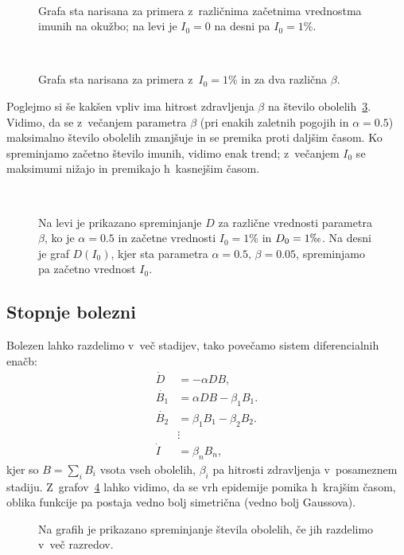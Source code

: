 \documentclass[a4paper,pdftex,10pt]{article}
\numberwithin{equation}{section} %
\numberwithin{figure}{section} %
\numberwithin{table}{section} %
\begin{document}
\begin{figure}    
    \resizebox{0.48\linewidth}{!}{}
    \resizebox{0.48\linewidth}{!}{}\\
    \caption{Grafa sta narisana za primera z~različnima začetnima vrednostma imunih na 
    okužbo; na levi je $I_0=0$ na desni pa $I_0=1\%$.}
    \label{slika15}
\end{figure}
\begin{figure}    
    \resizebox{0.48\linewidth}{!}{}
    \resizebox{0.48\linewidth}{!}{}\\
    \caption{Grafa sta narisana za primera z~$I_0=1\%$ in za dva različna $\beta$.}
    \label{slika16}
\end{figure}

Poglejmo si še kakšen vpliv ima hitrost zdravljenja $\beta$ na število 
obolelih~\ref{slika17}.  Vidimo, da se z~večanjem parametra $\beta$ (pri enakih zaletnih 
pogojih in $\alpha=0.5$) maksimalno število obolelih zmanjšuje in se premika proti daljšim
časom. 
Ko spreminjamo začetno število imunih, vidimo enak trend; z~večanjem $I_0$ se 
maksimumi nižajo in premikajo h~kasnejšim časom.
\begin{figure}    
    \resizebox{0.48\linewidth}{!}{}
    \resizebox{0.48\linewidth}{!}{}\\
    \caption{Na levi je prikazano spreminjanje $D$ za različne vrednosti parametra $\beta$, 
    ko je $\alpha=0.5$ in začetne vrednosti $I_0=1\%$ in $D_0=1\permil$. Na desni je 
    graf $D(I_0)$, kjer sta parametra $\alpha=0.5, \,\beta=0.05$, spreminjamo pa
    začetno vrednost $I_0$.}
    \label{slika17}
\end{figure}

\subsection{Stopnje bolezni}
Bolezen lahko razdelimo v~več stadijev, tako povečamo sistem diferencialnih enačb:
\begin{align}\label{epidemija}
    \dot{D} &= -\alpha D B, \\
    \dot{B_1} &= \alpha D B - \beta_1 B_1. \\
    \dot{B_2} &= \beta_1 B_1 - \beta_2 B_2. \\
    &\vdots \\
    \dot{I} &= \beta_n B_n,
\end{align}
kjer so $B=\sum_i B_i$ vsota vseh obolelih, $\beta_i$ pa hitrosti zdravljenja v~posameznem 
stadiju. Z~grafov~\ref{slika18} lahko vidimo, da se vrh epidemije pomika h~krajšim časom,
oblika funkcije pa postaja vedno bolj simetrična (vedno bolj Gaussova).
\begin{figure}    
    \centering
    \resizebox{0.48\linewidth}{!}{}
    \resizebox{0.48\linewidth}{!}{}
    \resizebox{0.48\linewidth}{!}{}
    \caption{Na grafih je prikazano spreminjanje števila obolelih, če jih razdelimo v~več
    razredov.}
    \label{slika18}
\end{figure}
\end{document}
